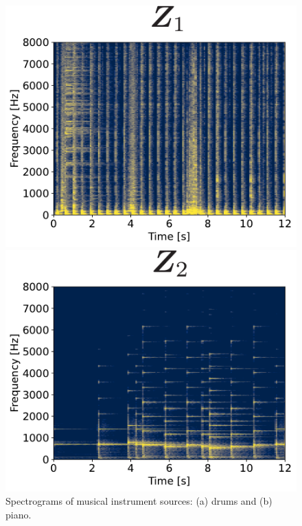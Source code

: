 \begin{figure}[htbp]
  \begin{minipage}[b]{0.45\linewidth}
    \centering
    \includegraphics[keepaspectratio, scale=0.38]{figures/Drums_spec_init.pdf}
    \subcaption{}
  \end{minipage}
  \begin{minipage}[b]{0.45\linewidth}
    \centering
    \includegraphics[keepaspectratio, scale=0.38]{figures/piano_spec_init.pdf}
    \subcaption{}
  \end{minipage}
  \caption{Spectrograms of musical instrument sources: (a) drums and (b) piano.}
  \label{fig:drum}
\end{figure}

